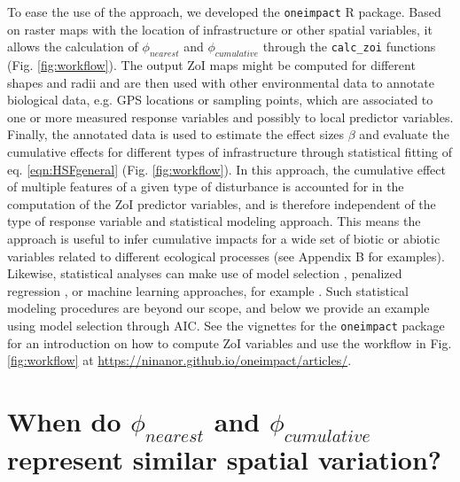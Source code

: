 \documentclass[titlepage]{article}
\begin{document}
To ease the use of the approach, we developed the \verb|oneimpact| R package. Based on raster maps with the location of infrastructure or other spatial variables, it allows the calculation of $\phi_{nearest}$ and $\phi_{cumulative}$ through the \verb|calc_zoi| functions (Fig. \ref{fig:workflow}). The output ZoI maps might be computed for different shapes and radii and are then used with other environmental data to annotate biological data, e.g. GPS locations or sampling points, which are associated to one or more measured response variables and possibly to local predictor variables. Finally, the annotated data is used to estimate the effect sizes $\beta$ and evaluate the cumulative effects for different types of infrastructure through statistical fitting of eq. \ref{eqn:HSFgeneral} (Fig. \ref{fig:workflow}). In this approach, the cumulative effect of multiple features of a given type of disturbance is accounted for in the computation of the ZoI predictor variables, and is therefore independent of the type of response variable and statistical modeling approach. This means the approach is useful to infer cumulative impacts for a wide set of biotic or abiotic variables \citep[similar to][]{lowe_scalescape_2022} related to different ecological processes (see Appendix B for examples).
Likewise, statistical analyses can make use of model selection \citep{burnham_model_2002,huais_multifit_2018}, penalized regression \citep{lee_estimating_2020}, or machine learning approaches, for example \citep{james_introduction_2021}. Such statistical modeling procedures are beyond our scope, and below we provide an example using model selection through AIC. See the vignettes for the \verb|oneimpact| package for an introduction on how to compute ZoI variables and use the workflow in Fig. \ref{fig:workflow} at \url{https://ninanor.github.io/oneimpact/articles/}.

\section{When do $\phi_{nearest}$ and $\phi_{cumulative}$ represent similar spatial variation?}
\end{document}
